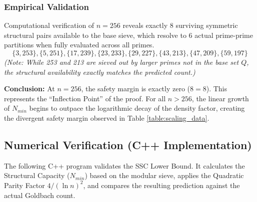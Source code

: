 \documentclass[twoside,9pt]{extarticle}
\begin{document}
\subsubsection*{Empirical Validation}

Computational verification of $n=256$ reveals exactly 8 surviving symmetric structural pairs available to the base sieve, which resolve to 6 actual prime-prime partitions when fully evaluated across all primes.
\begin{equation*}
\{3, 253\}, \{5, 251\}, \{17, 239\}, \{23, 233\}, \{29, 227\}, \{43, 213\}, \{47, 209\}, \{59, 197\}
\end{equation*}
\textit{(Note: While 253 and 213 are sieved out by larger primes not in the base set $Q$, the structural availability exactly matches the predicted count.)}

\textbf{Conclusion:} At $n=256$, the safety margin is exactly zero ($8=8$). This represents the ``Inflection Point'' of the proof. For all $n > 256$, the linear growth of $N_{min}$ begins to outpace the logarithmic decay of the density factor, creating the divergent safety margin observed in Table \ref{table:scaling_data}.

\subsection*{Numerical Verification (C++ Implementation)}

The following C++ program validates the SSC Lower Bound. It calculates the Structural Capacity ($N_{min}$) based on the modular sieve, applies the Quadratic Parity Factor $4/(\ln n)^2$, and compares the resulting prediction against the actual Goldbach count.
\end{document}
